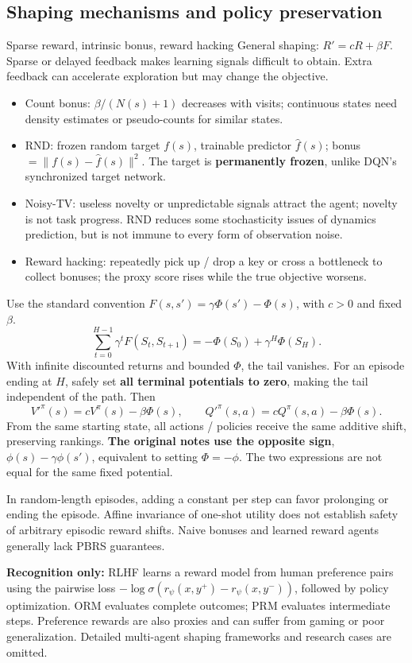 \documentclass[10pt,a4paper]{article}
\begin{document}
\subsection{Shaping mechanisms and policy preservation}
\begin{card}{Sparse reward, intrinsic bonus, reward hacking}
General shaping: $R'=cR+\beta F$. Sparse or delayed feedback makes learning signals difficult to obtain. Extra feedback can accelerate exploration but may change the objective.
\begin{itemize}
\item Count bonus: $\beta/(N(s)+1)$ decreases with visits; continuous states need density estimates or pseudo-counts for similar states.
\item RND: frozen random target $f(s)$, trainable predictor $\hat f(s)$; bonus$=\|f(s)-\hat f(s)\|^2$. The target is \textbf{permanently frozen}, unlike DQN's synchronized target network.
\item Noisy-TV: useless novelty or unpredictable signals attract the agent; novelty is not task progress. RND reduces some stochasticity issues of dynamics prediction, but is not immune to every form of observation noise.
\item Reward hacking: repeatedly pick up / drop a key or cross a bottleneck to collect bonuses; the proxy score rises while the true objective worsens.
\end{itemize}
\end{card}
\begin{prf}
Use the standard convention $F(s,s')=\gamma\Phi(s')-\Phi(s)$, with $c>0$ and fixed $\beta$.
\[
\sum_{t=0}^{H-1}\gamma^tF(S_t,S_{t+1})
=-\Phi(S_0)+\gamma^H\Phi(S_H).
\]
With infinite discounted returns and bounded $\Phi$, the tail vanishes. For an episode ending at $H$, safely set \textbf{all terminal potentials to zero}, making the tail independent of the path. Then
\[
V'^\pi(s)=cV^\pi(s)-\beta\Phi(s),\qquad
Q'^\pi(s,a)=cQ^\pi(s,a)-\beta\Phi(s).
\]
From the same starting state, all actions / policies receive the same additive shift, preserving rankings.
\textbf{The original notes use the opposite sign}, $\phi(s)-\gamma\phi(s')$, equivalent to setting $\Phi=-\phi$. The two expressions are not equal for the same fixed potential.
\end{prf}
\begin{note}
In random-length episodes, adding a constant per step can favor prolonging or ending the episode. Affine invariance of one-shot utility does not establish safety of arbitrary episodic reward shifts. Naive bonuses and learned reward agents generally lack PBRS guarantees.
\end{note}
\begin{plain}
\textbf{Recognition only:} RLHF learns a reward model from human preference pairs using the pairwise loss
$-\log\sigma(r_\psi(x,y^+)-r_\psi(x,y^-))$, followed by policy optimization.
ORM evaluates complete outcomes; PRM evaluates intermediate steps. Preference rewards are also proxies and can suffer from gaming or poor generalization. Detailed multi-agent shaping frameworks and research cases are omitted.
\end{plain}
\end{document}
